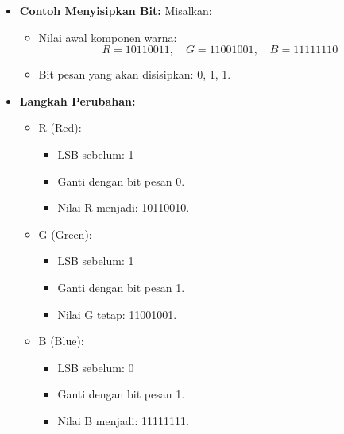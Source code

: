 \documentclass{ittelkom}
\begin{document}
\begin{enumerate}
\begin{enumerate}
                    \begin{itemize}
                        \item \textbf{Contoh Menyisipkan Bit:}
                              Misalkan:
                              \begin{itemize}
                                  \item Nilai awal komponen warna:
                                        \[
                                            R = 10110011, \quad G = 11001001, \quad B = 11111110
                                        \]
                                  \item Bit pesan yang akan disisipkan: 0, 1, 1.
                              \end{itemize}

                        \item \textbf{Langkah Perubahan:}
                              \begin{itemize}
                                  \item R (Red):
                                        \begin{itemize}
                                            \item LSB sebelum: 1
                                            \item Ganti dengan bit pesan 0.
                                            \item Nilai R menjadi: 10110010.
                                        \end{itemize}
                                  \item G (Green):
                                        \begin{itemize}
                                            \item LSB sebelum: 1
                                            \item Ganti dengan bit pesan 1.
                                            \item Nilai G tetap: 11001001.
                                        \end{itemize}
                                  \item B (Blue):
                                        \begin{itemize}
                                            \item LSB sebelum: 0
                                            \item Ganti dengan bit pesan 1.
                                            \item Nilai B menjadi: 11111111.
                                        \end{itemize}
                              \end{itemize}


\end{itemize}
\end{enumerate}
\end{enumerate}
\end{document}
